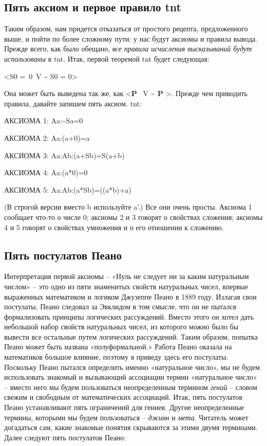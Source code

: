 \documentclass[../main.tex]{subfiles}
\begin{document}
\subsection{Пять аксиом и первое правило \acs{tnt}}

Таким образом, нам придется отказаться от простого рецепта, предложенного выше, и пойти по более сложному пути: у нас будут аксиомы и правила вывода. Прежде всего, как было обещано, \emph{все правила исчисления высказываний будут использованы} в \acs{tnt}. Итак, первой теоремой \acs{tnt} будет следующая:

\textless S0 =~0~V \textasciitilde{} S0 = 0\textgreater{}

Она может быть выведена так же, как \textless{}\textbf{P} ~V \textbf{\textasciitilde{} P} \textgreater. Прежде чем приводить правила, давайте запишем пять аксиом. \acs{tnt}:

АКСИОМА 1: Aa:\textasciitilde Sa=0

АКСИОМА 2: Aa:(a+0)=a

АКСИОМА 3: Aa:Ab:(a+Sb)=S(a+b)

АКСИОМА 4: Aa:(a*0)=0

АКСИОМА 5: Aa:Ab:(a*Sb)=((a*b)+a)

(В строгой версии вместо b используйте a'.) Все они очень просты. Аксиома 1 сообщает что-то о числе 0; аксиомы 2 и 3 говорят о свойствах сложения; аксиомы 4 и 5 говорят о свойствах умножения и о его отношении к сложению.


\subsection{Пять постулатов Пеано}

Интерпретация первой аксиомы \--- «Нуль не следует ни за каким натуральным числом» \--- это одно из пяти знаменитых свойств натуральных чисел, впервые выраженных математиком и логиком Джузеппе Пеано в 1889 году. Излагая свои постулаты, Пеано следовал за Эвклидом в том смысле, что он не пытался формализовать принципы логических рассуждений. Вместо этого он хотел дать небольшой набор свойств натуральных чисел, из которого можно было бы вывести все остальные путем логических рассуждений. Таким образом, попытка Пеано может быть названа «полуформальной.» Работа Пеано оказала на математиков большое влияние, поэтому я приведу здесь его постулаты. Поскольку Пеано пытался определить именно «натуральное число», мы не будем использовать знакомый и вызывающий ассоциации термин «натуральное число» \--- вместо него мы будем пользоваться неопределенным термином \emph{гений} \--- словом свежим и свободным от математических ассоциаций. Итак, пять постулатов Пеано устанавливают пять ограничений для гениев. Другие неопределенные термины, которыми мы будем пользоваться \--- \emph{джинн} и \emph{мета}. Читатель может догадаться сам, какие знакомые понятия скрываются за этими двумя терминами. Далее следуют пять постулатов Пеано:
\end{document}
